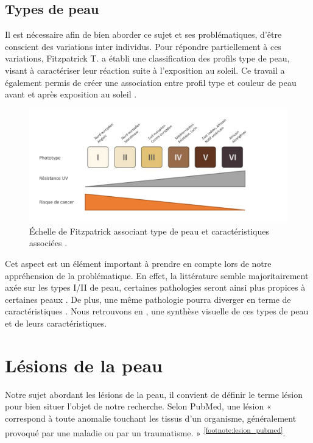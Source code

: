 \subsection{Types de peau}
Il est nécessaire afin de bien aborder ce sujet et ses problématiques, d’être conscient des variations inter individus. Pour répondre partiellement à ces variations, Fitzpatrick T. a établi une classification des profils type de peau, visant à caractériser leur réaction suite à l’exposition au soleil. Ce travail a également permis de créer une association entre profil type et couleur de peau avant et après exposition au soleil \cite{Fitzpatrick1988}. 
\begin{figure}[H]
    \centering
    \includegraphics[width=\linewidth]{contents/chapter_1/resources/scheme_fitzpatrick_scale.pdf}
    \caption{Échelle de Fitzpatrick associant type de peau et caractéristiques associées \cite{Fitzpatrick1988}.}
    \label{fig:scheme_fitzpatrick_scale}
\end{figure}
Cet aspect est un élément important à prendre en compte lors de notre appréhension de la problématique. En effet, la littérature semble majoritairement axée sur les types I/II de peau, certaines pathologies seront ainsi plus propices à certaines peaux \cite{Narayanan2010}. De plus, une même pathologie pourra diverger en terme de caractéristiques \cite{Tuma2015}. Nous retrouvons en , une synthèse visuelle de ces types de peau et de leurs caractéristiques.

\section{Lésions de la peau}
Notre sujet abordant les lésions de la peau, il convient de définir le terme lésion pour bien situer l’objet de notre recherche. Selon PubMed, une lésion « correspond à toute anomalie touchant les tissus d’un organisme, généralement provoqué par une maladie ou par un traumatisme. » \textsuperscript{\ref{footnote:lesion_pubmed}}.\par
\addtocounter{footnote}{1}

